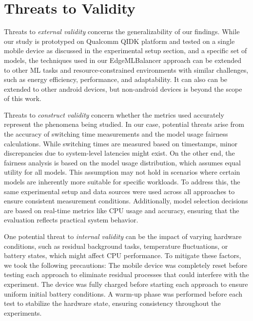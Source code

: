 \section{Threats to Validity}

Threats to \textit{external validity} concerns the generalizability of our findings. While our study is prototyped on Qualcomm QIDK platform and tested on a single mobile device as discussed in the experimental setup section, and a specific set of models, the techniques used in our EdgeMLBalancer approach can be extended to other ML tasks and resource-constrained environments with similar challenges, such as energy efficiency, performance, and adaptability. It can also can be extended to other android devices, but non-android devices is beyond the scope of this work.

Threats to \textit{construct validity} concern whether the metrics used accurately represent the phenomena being studied. In our case, potential threats arise from the accuracy of switching time measurements and the model usage fairness calculations. While switching times are measured based on timestamps, minor discrepancies due to system-level latencies might exist. On the other end, the fairness analysis is based on the model usage distribution, which assumes equal utility for all models. This assumption may not hold in scenarios where certain models are inherently more suitable for specific workloads. To address this, the same experimental setup and data sources were used across all approaches to ensure consistent measurement conditions. Additionally, model selection decisions are based on real-time metrics like CPU usage and accuracy, ensuring that the evaluation reflects practical system behavior. 

One potential threat to \textit{internal validity} can be the impact of varying hardware conditions, such as residual background tasks, temperature fluctuations, or battery states, which might affect CPU performance. To mitigate these factors, we took the following precautions: The mobile device was completely reset before testing each approach to eliminate residual processes that could interfere with the experiment. The device was fully charged before starting each approach to ensure uniform initial battery conditions. A warm-up phase was performed before each test to stabilize the hardware state, ensuring consistency throughout the experiments. 

